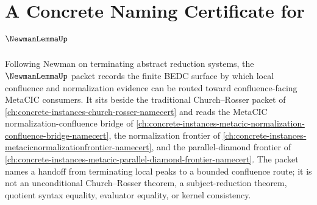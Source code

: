 \chapter{A Concrete Naming Certificate for $\NewmanLemmaUp$}
\label{ch:concrete-instances-newman-lemma-namecert}

Following Newman on terminating abstract reduction systems, the $\NewmanLemmaUp$ packet records the finite BEDC surface by which local confluence and normalization evidence can be routed toward confluence-facing MetaCIC consumers. It sits beside the traditional Church--Rosser packet of \autoref{ch:concrete-instances-church-rosser-namecert} and reads the MetaCIC normalization-confluence bridge of \autoref{ch:concrete-instances-metacic-normalization-confluence-bridge-namecert}, the normalization frontier of \autoref{ch:concrete-instances-metacicnormalizationfrontier-namecert}, and the parallel-diamond frontier of \autoref{ch:concrete-instances-metacic-parallel-diamond-frontier-namecert}. The packet names a handoff from terminating local peaks to a bounded confluence route; it is not an unconditional Church--Rosser theorem, a subject-reduction theorem, quotient syntax equality, evaluator equality, or kernel consistency.

